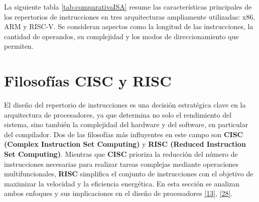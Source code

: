 \documentclass[12pt,oneside]{templates/unerthesis}
\begin{document}
La siguiente tabla \ref{tab:comparativaISA} resume las características principales de los repertorios de instrucciones en tres arquitecturas ampliamente utilizadas: x86, ARM y RISC-V. Se consideran aspectos como la longitud de las instrucciones, la cantidad de operandos, su complejidad y los modos de direccionamiento que permiten.

\begin{table}[!h]
\centering
\caption{\label{tab:comparativaISA}Comparativa de repertorios de instrucciones reales}
\centering
{}
\end{table}

\hypertarget{filosofuxedas-cisc-y-risc}{%
\section{Filosofías CISC y RISC}\label{filosofuxedas-cisc-y-risc}}

El diseño del repertorio de instrucciones es una decisión estratégica clave en la arquitectura de procesadores, ya que determina no solo el rendimiento del sistema, sino también la complejidad del hardware y del software, en particular del compilador. Dos de las filosofías más influyentes en este campo son \textbf{CISC (Complex Instruction Set Computing)} y \textbf{RISC (Reduced Instruction Set Computing)}. Mientras que \textbf{CISC} prioriza la reducción del número de instrucciones necesarias para realizar tareas complejas mediante operaciones multifuncionales, \textbf{RISC} simplifica el conjunto de instrucciones con el objetivo de maximizar la velocidad y la eficiencia energética. En esta sección se analizan ambos enfoques y sus implicaciones en el diseño de procesadores \protect\hyperlink{ref-hennessy2017computer}{{[}13{]}}, \protect\hyperlink{ref-patterson_computer_2014}{{[}28{]}}.
\end{document}
